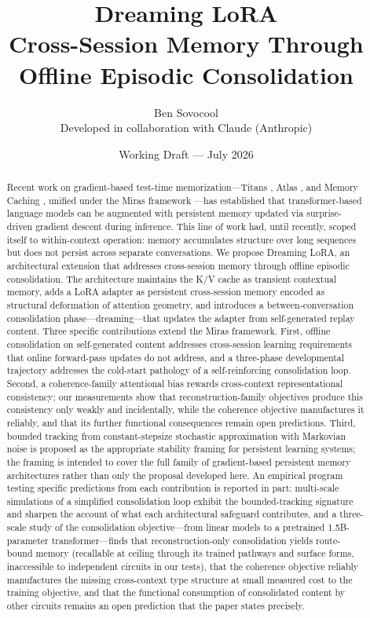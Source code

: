 \documentclass[11pt]{article}
\title{Dreaming LoRA\\[4pt]
{\large Cross-Session Memory Through Offline Episodic Consolidation}}
\author{Ben Sovocool\\
\small Developed in collaboration with Claude (Anthropic)}
\date{Working Draft --- July 2026}
\begin{document}
\maketitle

\begin{abstract}
Recent work on gradient-based test-time memorization---Titans \cite{behrouz2024titans}, Atlas \cite{behrouz2025atlas}, and Memory Caching \cite{behrouz2026memcache}, unified under the Miras framework \cite{behrouz2025miras}---has established that transformer-based language models can be augmented with persistent memory updated via surprise-driven gradient descent during inference. This line of work had, until recently, scoped itself to within-context operation: memory accumulates structure over long sequences but does not persist across separate conversations. We propose Dreaming LoRA, an architectural extension that addresses cross-session memory through offline episodic consolidation. The architecture maintains the K/V cache as transient contextual memory, adds a LoRA adapter as persistent cross-session memory encoded as structural deformation of attention geometry, and introduces a between-conversation consolidation phase---dreaming---that updates the adapter from self-generated replay content. Three specific contributions extend the Miras framework. First, offline consolidation on self-generated content addresses cross-session learning requirements that online forward-pass updates do not address, and a three-phase developmental trajectory addresses the cold-start pathology of a self-reinforcing consolidation loop. Second, a coherence-family attentional bias rewards cross-context representational consistency; our measurements show that reconstruction-family objectives produce this consistency only weakly and incidentally, while the coherence objective manufactures it reliably, and that its further functional consequences remain open predictions. Third, bounded tracking from constant-stepsize stochastic approximation with Markovian noise is proposed as the appropriate stability framing for persistent learning systems; the framing is intended to cover the full family of gradient-based persistent memory architectures rather than only the proposal developed here. An empirical program testing specific predictions from each contribution is reported in part: multi-scale simulations of a simplified consolidation loop exhibit the bounded-tracking signature and sharpen the account of what each architectural safeguard contributes, and a three-scale study of the consolidation objective---from linear models to a pretrained 1.5B-parameter transformer---finds that reconstruction-only consolidation yields route-bound memory (recallable at ceiling through its trained pathways and surface forms, inaccessible to independent circuits in our tests), that the coherence objective reliably manufactures the missing cross-context type structure at small measured cost to the training objective, and that the functional consumption of consolidated content by other circuits remains an open prediction that the paper states precisely.
\end{abstract}
\end{document}
